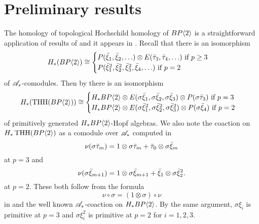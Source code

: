 
\section{Preliminary results}\label{sec prelim}
The homology of topological Hochschild homology of $BP\langle 2 \rangle$ is a straightforward application of results of \cites{BMMS86,Bok85,AngeltveitRognes} and it appears in \cite[Thm. 5.12]{AngeltveitRognes}. Recall that there is an isomorphism
\[H_*(BP\langle 2 \rangle)\cong \begin{cases} P(\bar{\xi}_1,\bar{\xi}_2,\ldots )\otimes E(\bar{\tau}_{3},\bar{\tau}_4,\ldots) \text{ if } p \ge 3 \\ P(\bar{\xi}_1^2,\bar{\xi}_2^2,\bar{\xi}_3^2,\bar{\xi}_4,\ldots) \text{ if } p=2 \end{cases}\]
of $\mathscr{A}_*$-comodules. Then by \cite[Thm. 5.12]{AngeltveitRognes} there is an isomorphism
\begin{equation}\label{HTHHB} H_*(\operatorname{THH}(BP\langle 2 \rangle))\cong \begin{cases} H_*BP\langle 2 \rangle \otimes E(\sigma{\bar{\xi}_1},\sigma{\bar{\xi}_2},\sigma{\bar{\xi}_3})\otimes P(\sigma{\bar{\tau}_3})\text{ if } p = 3 \\ H_*BP\langle 2 \rangle\otimes E(\sigma{\bar{\xi}^2_1},\sigma{\bar{\xi}^2_2},\sigma{\bar{\xi}^2_3})\otimes P(\sigma{\bar{\xi}_4}) \text{ if }p=2\end{cases}\end{equation}
of primitively generated $H_*BP\langle 2 \rangle$-Hopf algebras. We also note the coaction on $H_*\operatorname{THH}(BP\langle 2 \rangle)$ as a comodule over $\mathscr{A}_*$ computed in \cite[Thm. 5.12]{AngeltveitRognes}
\begin{equation}\label{coactp>2}\nu ( \sigma{\bar{\tau}_m}) = 1\otimes \sigma \bar{\tau}_m + \bar{\tau}_0\otimes\sigma{\bar{\xi}_m}\end{equation}
at $p = 3$ and 
\begin{equation}\label{coactp=2} \nu(\sigma{\bar{\xi}_{m+1}})=1\otimes\sigma{\bar{\xi}_{m+1}}+\bar{\xi}_1\otimes\sigma\bar{\xi}_2^2.\end{equation}
at $p=2$. These both follow from the formula
\begin{equation}\label{coactsigma} \nu \circ \sigma = (1\otimes \sigma)\circ \nu \end{equation}
in \cite[Eq. 5.11]{AngeltveitRognes} and the well known $\mathscr{A}_*$-coaction on $H_*BP\langle 2 \rangle$. By the same argument, $\sigma \xi_i$ is primitive at $p=3$ and $\sigma \xi_i^2$ is primitive at $p=2$ for $i=1,2,3$.
